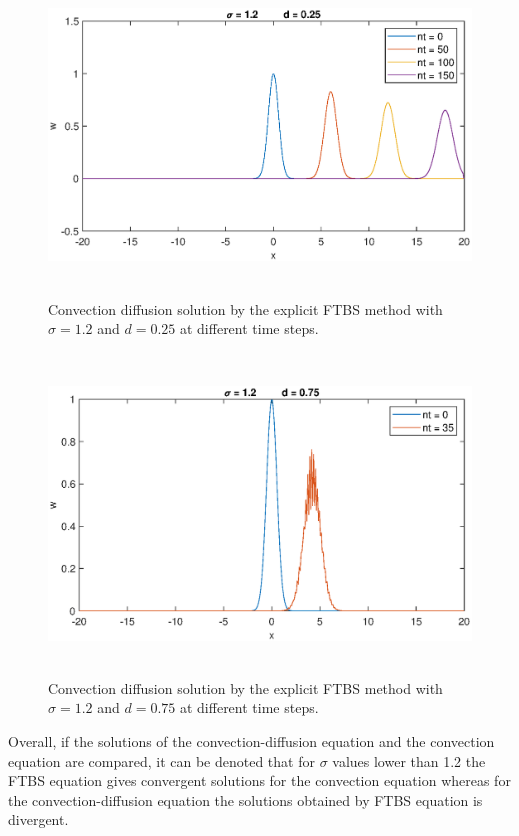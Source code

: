 \documentclass[letterpaper,12pt]{article}
\begin{document}
\begin{figure}[H] 
	\centering 
	\includegraphics[max height=8.5cm]{graphs/FTBS/ConvectionDiffusion/sigma12d025.eps}
	\caption{Convection diffusion solution by the explicit FTBS method with $\sigma= 1.2$ and $d=0.25$ at different time steps.}
	 \label{fig:FTBSsigma12d025}
\end{figure}
\vspace{1cm}
\begin{figure}[H] 
	\centering 
	\includegraphics[max height=8.5cm]{graphs/FTBS/ConvectionDiffusion/sigma12d075.eps}
	\caption{Convection diffusion solution by the explicit FTBS method with $\sigma= 1.2$ and $d=0.75$ at different time steps.}
	 \label{fig:FTBSsigma12d075}
\end{figure}

\newpage

Overall, if the solutions of the convection-diffusion equation and the convection equation are
compared, it can be denoted that for $\sigma$ values lower than 1.2 the FTBS equation gives convergent
solutions for the convection equation whereas for the convection-diffusion equation the solutions
obtained by FTBS equation is divergent.
\end{document}
